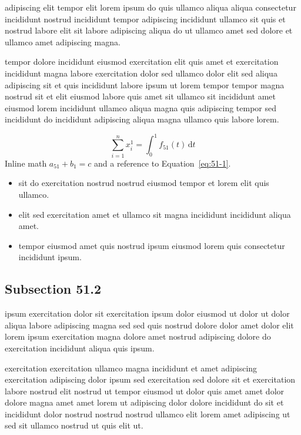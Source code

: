 \documentclass{article}
\begin{document}
adipiscing elit tempor elit lorem ipsum do quis ullamco aliqua aliqua consectetur incididunt nostrud incididunt tempor adipiscing incididunt ullamco sit quis et nostrud labore elit sit labore adipiscing aliqua do ut ullamco amet sed dolore et ullamco amet adipiscing magna.

tempor dolore incididunt eiusmod exercitation elit quis amet et exercitation incididunt magna labore exercitation dolor sed ullamco dolor elit sed aliqua adipiscing sit et quis incididunt labore ipsum ut lorem tempor tempor magna nostrud sit et elit eiusmod labore quis amet sit ullamco sit incididunt amet eiusmod lorem incididunt ullamco aliqua magna quis adipiscing tempor sed incididunt do incididunt adipiscing aliqua magna ullamco quis labore lorem.

\begin{equation}\label{eq:51-1}
  \sum_{i=1}^{n} x_i^{1} = \int_0^1 f_{51}(t)\,\mathrm{d}t
\end{equation}
Inline math $a_{51} + b_{1} = c$ and a reference to Equation~\eqref{eq:51-1}.

\begin{itemize}
  \item sit do exercitation nostrud nostrud eiusmod tempor et lorem elit quis ullamco.
  \item elit sed exercitation amet et ullamco sit magna incididunt incididunt aliqua amet.
  \item tempor eiusmod amet quis nostrud ipsum eiusmod lorem quis consectetur incididunt ipsum.
\end{itemize}

\subsection{Subsection 51.2}\label{sec:51-2}
ipsum exercitation dolor sit exercitation ipsum dolor eiusmod ut dolor ut dolor aliqua labore adipiscing magna sed sed quis nostrud dolore dolor amet dolor elit lorem ipsum exercitation magna dolore amet nostrud adipiscing dolore do exercitation incididunt aliqua quis ipsum.

exercitation exercitation ullamco magna incididunt et amet adipiscing exercitation adipiscing dolor ipsum sed exercitation sed dolore sit et exercitation labore nostrud elit nostrud ut tempor eiusmod ut dolor quis amet amet dolor dolore magna amet amet lorem ut adipiscing dolor dolore incididunt do sit et incididunt dolor nostrud nostrud nostrud ullamco elit lorem amet adipiscing ut sed sit ullamco nostrud ut quis elit ut.
\end{document}
